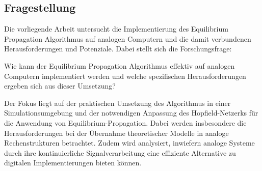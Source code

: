 \subsection{Fragestellung}

Die vorliegende Arbeit untersucht die Implementierung des Equilibrium Propagation Algorithmus auf analogen Computern und die damit verbundenen Herausforderungen und Potenziale. Dabei stellt sich die Forschungsfrage:

Wie kann der Equilibrium Propagation Algorithmus effektiv auf analogen Computern implementiert werden und welche spezifischen Herausforderungen ergeben sich aus dieser Umsetzung?

Der Fokus liegt auf der praktischen Umsetzung des Algorithmus in einer Simulationsumgebung und der notwendigen Anpassung des Hopfield-Netzerks für die Anwendung von Equilibrium-Propagation. Dabei werden insbesondere die Herausforderungen bei der Übernahme theoretischer Modelle in analoge Rechenstrukturen betrachtet. Zudem wird analysiert, inwiefern analoge Systeme durch ihre kontinuierliche Signalverarbeitung eine effiziente Alternative zu digitalen Implementierungen bieten können.
